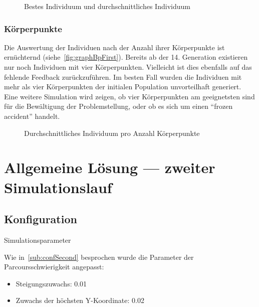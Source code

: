       \begin{figure}[H]
        \centering
        
        \caption{Bestes Individuum und durchschnittliches Individuum\label{fig:graphFirst}}
      \end{figure}

      \subsubsection{Körperpunkte\label{subsub:bp}}

        Die Auswertung der Individuen nach der Anzahl ihrer Körperpunkte ist ernüchternd (siehe~\vref{fig:graphBpFirst}).
        Bereits ab der 14. Generation existieren nur noch Individuen mit vier Körperpunkten.
        Vielleicht ist dies ebenfalls auf das fehlende Feedback zurückzuführen.
        Im besten Fall wurden die Individuen mit mehr als vier Körperpunkten der initialen Population unvorteilhaft generiert.
        Eine weitere Simulation wird zeigen,
        ob vier Körperpunkten am geeignetsten sind für die Bewältigung der Problemstellung,
        oder ob es sich um einen ``frozen accident'' handelt.

        \begin{figure}[H]
          \centering
          
          \caption{Durchschnittliches Individuum pro Anzahl Körperpunkte\label{fig:graphBpFirst}}
        \end{figure}

  \section{Allgemeine Lösung --- zweiter Simulationslauf}

    \subsection{Konfiguration}

      \begin{table}[H]
        \centering
        
        \caption{Simulationsparameter}
      \end{table}

      Wie in~\vref{sub:confSecond} besprochen wurde die Parameter der Parcoursschwierigkeit angepasst:

      \begin{itemize}
        \item Steigungszuwachs: 0.01
        \item Zuwachs der höchsten Y-Koordinate: 0.02
      \end{itemize}

